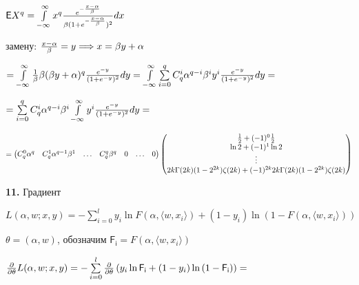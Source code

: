 \documentclass[a4paper,12pt]{article}
\begin{document}
\begin{center}
    $\mathsf{E}X^{q} = \int\limits_{-\infty}^{\infty} x^{q} {e^{-{x - \alpha\over{\beta}}}\over{\beta(1 + e^{-{x - \alpha\over{\beta}}}})^2} d x$
\end{center}

 замену: ${x - \alpha\over{\beta}} = y \Longrightarrow x = \beta y + \alpha$

\begin{center}
    $= \int\limits_{-\infty}^{\infty} {1\over{\beta}} \beta (\beta y + \alpha)^q {e^{-y}\over{(1 + e^{-y}})^2} d y = \int\limits_{-\infty}^{\infty} \sum\limits_{i = 0}^q C_q^i \alpha^{q - i} \beta^i y^i {e^{-y}\over{(1 + e^{-y}})^2} d y = $
\end{center}

\begin{center}
    $= \sum\limits_{i = 0}^q C_q^i \alpha^{q - i} \beta^{i}  \int\limits_{-\infty}^{\infty} y^i {e^{-y}\over{(1 + e^{-y}})^2} d y =$
\end{center}

\begin{displaymath}
    = \begin{pmatrix}
        C_q^0 \alpha^q & C_q^1 \alpha^{q - 1} \beta^1 & \ldots & C_q^q \beta^{q} & 0 & \ldots & 0 \\
    \end{pmatrix} \begin{pmatrix}
        {1\over{2}} + (-1)^{0}{1\over{2}} \\ \ln{2} + (-1)^{1}\ln{2} \\ \vdots \\ 2k \Gamma(2k) (1 - 2^{2k}) \zeta(2k) + (-1)^{2k} 2k \Gamma(2k) (1 - 2^{2k}) \zeta(2k)\\
    \end{pmatrix}
\end{displaymath}

\noindent\textbf{11.} Градиент

\begin{center}
    $L(\alpha, w; x, y) = -\sum\limits_{i = 0}^l y_i \ln{F(\alpha, \langle w, x_i\rangle)} + (1 - y_i) \ln{(1 - F(\alpha, \langle w, x_i \rangle))}$
\end{center}

 $\theta = (\alpha, w)$, обозначим $\mathsf{F_i} = F(\alpha, \langle w, x_i\rangle)$

\begin{center}
    ${\partial\over{\partial \theta}} L(\alpha, w; x, y) = -\sum\limits_{i = 0}^l {\partial\over{\partial \theta}} \left( y_i \ln{\mathsf{F_i}} + (1 - y_i) \ln{(1 - \mathsf{F_i})} \right) =$
\end{center}
\end{document}
